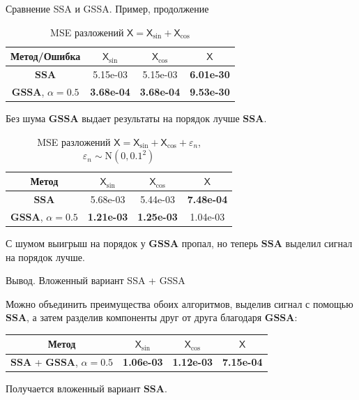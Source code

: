 \documentclass[notheorems, handout]{beamer}
\newcommand{\SSA}{\textbf{SSA}}
\newcommand{\GSSA}{\textbf{GSSA}}
\newcommand{\TS}{\mathsf{X}}
\begin{document}
	
	\begin{frame}{Сравнение SSA и GSSA. Пример, продолжение}
		\begin{table}[H]
			\caption{MSE разложений $\TS = \TS_{\sin} + \TS_{\cos}$}
			\centering
			\begin{tabular}{c|ccc}
				\hline
				Метод/Ошибка & $\TS_{\sin}$ & $\TS_{\cos}$ & $\TS$ \\ 
				\hline
				$\SSA$   & 5.15e-03 & 5.15e-03 & \textbf{6.01e-30}\\ 
				$\GSSA$, $\alpha = 0.5$  & \textbf{3.68e-04} & \textbf{3.68e-04} & \textbf{9.53e-30} \\ 
				\hline
			\end{tabular}
			\label{tab:mse_ssa_gssa}
		\end{table}
		Без шума $\GSSA$ выдает результаты на порядок лучше $\SSA$.

		\begin{table}[H]
			\caption{MSE разложений $\TS = \TS_{\sin} + \TS_{\cos}+
		\varepsilon_n$, $\varepsilon_n \sim \mathrm N(0, 0.1^2)$ }
			\centering
			\begin{tabular}{c|ccc}
				\hline
				Метод & $\TS_{\sin}$ & $\TS_{\cos}$ & $\TS$ \\ 
				\hline
				$\SSA$      & 5.68e-03 & 5.44e-03 & \textbf{7.48e-04}  \\ 
				$\GSSA$, $\alpha = 0.5$ & \textbf{1.21e-03} & \textbf{1.25e-03} & 1.04e-03 \\
				\hline
			\end{tabular}
			\label{tab:errs_ssa_gssa}
		\end{table}
		
		С шумом выигрыш на порядок у $\GSSA$ пропал, но теперь $\SSA$ выделил сигнал на порядок лучше.

	\end{frame}
	
	
	
	\begin{frame}{Вывод. Вложенный вариант SSA + GSSA}

		Можно объединить преимущества обоих алгоритмов, выделив сигнал с помощью $\SSA$, а затем разделив компоненты друг от друга благодаря $\GSSA$:
		\begin{table}[H]
			\label{tab:errs_ssa_gssa_united}
			\centering
			\begin{tabular}{c|ccc}
				\hline
				Метод & $\TS_{\sin}$ & $\TS_{\cos}$ & $\TS$ \\ 
				\hline
				$\SSA$ + $\GSSA$, $\alpha = 0.5$ & \textbf{1.06e-03} & \textbf{1.12e-03} & \textbf{7.15e-04} \\ 
				\hline
			\end{tabular}
		\end{table}

		Получается вложенный вариант $\SSA$.

	\end{frame}
	
\end{document}
